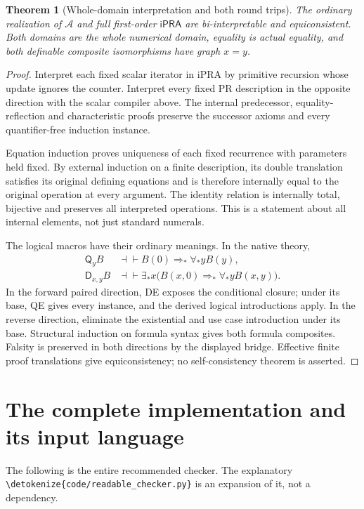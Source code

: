 \documentclass[11pt,letterpaper]{article}
\newtheorem{theorem}{Theorem}[section]
\theoremstyle{definition}\newtheorem{definition}[theorem]{Definition}
\theoremstyle{remark}\newtheorem{remark}[theorem]{Remark}
\newcommand{\ipra}{\mathsf{iPRA}}
\newcommand{\D}{\mathsf D}
\newcommand{\Q}{\mathsf Q}
\newcommand{\file}[1]{\expandafter\nolinkurl\expandafter{\detokenize{#1}}}
\begin{document}
\begin{theorem}[Whole-domain interpretation and both round trips]
The ordinary realization of \(\mathcal A\) and full first-order
\(\ipra\) are bi-interpretable and equiconsistent. Both domains are
the whole numerical domain, equality is actual equality, and both
definable composite isomorphisms have graph \(x=y\).
\end{theorem}
\begin{proof}
Interpret each fixed scalar iterator in iPRA by primitive recursion
whose update ignores the counter. Interpret every fixed PR description
in the opposite direction with the scalar compiler above. The internal
predecessor, equality-reflection and characteristic proofs preserve the
successor axioms and every quantifier-free induction instance.

Equation induction proves uniqueness of each fixed recurrence with
parameters held fixed. By external induction on a finite description,
its double translation satisfies its original defining equations and
is therefore internally equal to the original operation at every
argument. The identity relation is internally total, bijective and
preserves all interpreted operations. This is a statement about all
internal elements, not just standard numerals.

The logical macros have their ordinary meanings. In the native theory,
\begin{align*}
 \Q_yB&\dashv\vdash B(0)\Rightarrow_*\forall_*yB(y),\\
 \D_{x,y}B&\dashv\vdash
 \exists_*x\bigl(B(x,0)\Rightarrow_*\forall_*yB(x,y)\bigr).
\end{align*}
In the forward paired direction, DE exposes the conditional closure;
under its base, QE gives every instance, and the derived logical
introductions apply. In the reverse direction, eliminate the
existential and use case introduction under its base. Structural
induction on formula syntax gives both formula composites. Falsity is
preserved in both directions by the displayed bridge. Effective finite
proof translations give equiconsistency; no self-consistency theorem
is asserted.
\end{proof}

\section{The complete implementation and its input language}
\label{sec:implementation}

The following is the entire recommended checker. The explanatory
\file{code/readable_checker.py} is an expansion of it, not a dependency.

\end{document}
